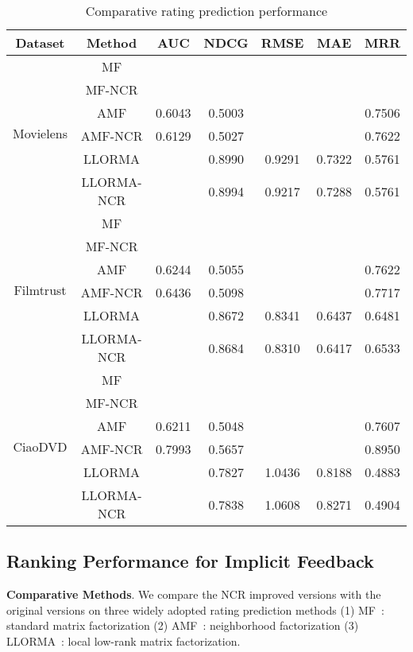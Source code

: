 \documentclass[letterpaper]{article} %
\begin{document}
\begin{table}[htp]
\tiny
\caption{Comparative rating prediction performance}
\begin{center}
\begin{tabular}{|c|c|c|c|c|c|c|}
\hline
Dataset & Method & AUC & NDCG & RMSE & MAE & MRR \\\hline
\multirow{6}{*}{Movielens} & MF & & & & & \\\cline{2-7}
 & MF-NCR & & & & & \\\cline{2-7}
 & AMF &0.6043 &0.5003 & & &0.7506 \\\cline{2-7}
 & AMF-NCR &0.6129 &0.5027 & & &0.7622 \\\cline{2-7}
 & LLORMA & &0.8990 &0.9291 &0.7322 &0.5761 \\\cline{2-7}
 & LLORMA-NCR & &0.8994 &0.9217 &0.7288 &0.5761 \\\hline
\multirow{6}{*}{Filmtrust} & MF & & & & & \\\cline{2-7}
 & MF-NCR & & & & & \\\cline{2-7}
 & AMF &0.6244 &0.5055 & & &0.7622 \\\cline{2-7}
 & AMF-NCR &0.6436 &0.5098 & & &0.7717 \\\cline{2-7}
 & LLORMA & &0.8672 &0.8341 &0.6437 &0.6481 \\\cline{2-7}
 & LLORMA-NCR & &0.8684 &0.8310 &0.6417 &0.6533 \\\hline
 \multirow{6}{*}{CiaoDVD} & MF & & & & & \\\cline{2-7}
 & MF-NCR & & & & & \\\cline{2-7}
 & AMF &0.6211 &0.5048 & & &0.7607\\\cline{2-7}
 & AMF-NCR &0.7993 &0.5657 & & &0.8950 \\\cline{2-7}
 & LLORMA & &0.7827 &1.0436 &0.8188 &0.4883 \\\cline{2-7}
 & LLORMA-NCR & &0.7838 &1.0608 &0.8271 &0.4904 \\\hline
\end{tabular}
\end{center}
\label{tab:ratingresult}
\end{table}%

\subsection{Ranking Performance for Implicit Feedback}

\textbf{Comparative Methods}. We compare the NCR improved versions with the original versions on three widely adopted rating prediction methods (1) MF~\cite{Koren2009Matrix}: standard matrix factorization  (2) AMF~\cite{Koren2008Factorization}: neighborhood factorization (3) LLORMA~\cite{Lee2013Local}: local low-rank matrix factorization. 
\end{document}
